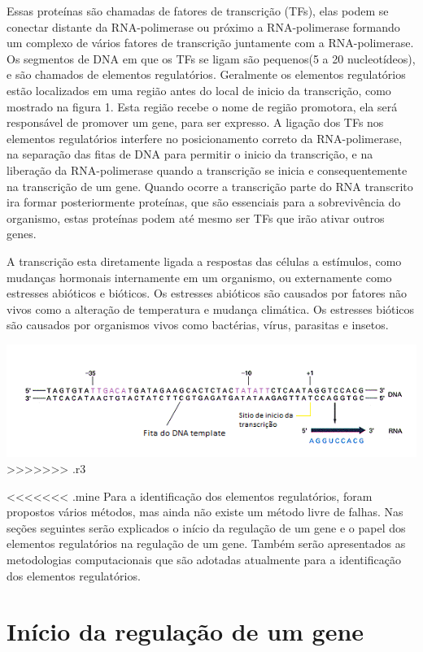 Essas proteínas são chamadas de fatores de transcrição (TFs), elas podem se conectar distante da RNA-polimerase ou próximo a RNA-polimerase formando um complexo de vários fatores de transcrição juntamente com a RNA-polimerase. Os segmentos de DNA em que os TFs se ligam são pequenos(5 a 20 nucleotídeos), e são chamados de elementos regulatórios. Geralmente os elementos regulatórios estão  localizados em uma região antes do local de inicio da transcrição, como mostrado na figura 1. Esta região recebe o nome de região promotora, ela será responsável de promover um gene, para ser expresso. A ligação dos TFs nos elementos regulatórios interfere no posicionamento correto da RNA-polimerase, na separação das fitas de DNA para permitir o inicio da transcrição, e na liberação da RNA-polimerase quando a transcrição se inicia e consequentemente na transcrição de um gene. Quando ocorre a transcrição parte do RNA transcrito ira formar posteriormente proteínas, que são essenciais para a sobrevivência do organismo, estas proteínas podem até mesmo ser TFs que irão ativar outros genes.

A transcrição esta diretamente ligada a respostas das células a estímulos, como mudanças hormonais internamente em um organismo, ou externamente como estresses abióticos e bióticos. Os estresses abióticos são causados por fatores não vivos como a alteração de temperatura e mudança climática. Os estresses bióticos são causados por organismos vivos como bactérias, vírus, parasitas e insetos.


\includegraphics[]{imagens/regiaopromotora}
>>>>>>> .r3

<<<<<<< .mine
Para a identificação dos elementos regulatórios, foram propostos vários métodos, mas ainda não existe um método livre de falhas. Nas seções seguintes serão explicados o início da regulação de um gene e o papel dos elementos regulatórios na regulação de um gene. Também serão apresentados as metodologias computacionais que são adotadas atualmente para a identificação dos elementos regulatórios.

\section{Início da regulação de um gene}

